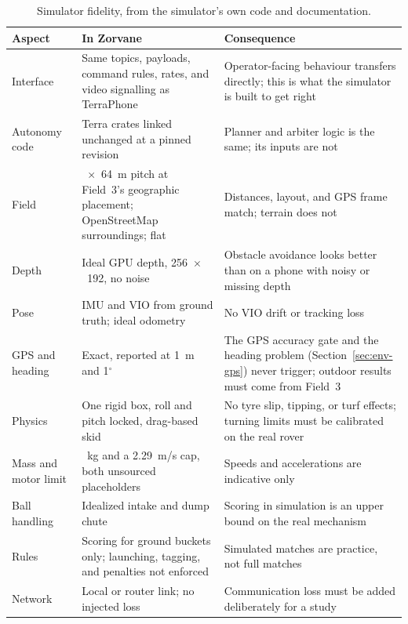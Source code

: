 \begin{table}[ht]
\centering
\small
\caption{Simulator fidelity, from the simulator's own code and documentation.}
\label{tab:sim-fidelity}
\begin{tabularx}{\textwidth}{@{}>{\raggedright\arraybackslash}p{2.6cm} >{\raggedright\arraybackslash}X >{\raggedright\arraybackslash}X@{}}
\toprule
Aspect & In Zorvane & Consequence \\
\midrule
Interface & Same topics, payloads, command rules, rates, and video signalling as TerraPhone & Operator-facing behaviour transfers directly; this is what the simulator is built to get right \\
Autonomy code & Terra crates linked unchanged at a pinned revision & Planner and arbiter logic is the same; its inputs are not \\
Field & 100~$\times$~64~m pitch at Field~3's geographic placement; OpenStreetMap surroundings; flat & Distances, layout, and GPS frame match; terrain does not \\
Depth & Ideal GPU depth, 256~$\times$~192, no noise & Obstacle avoidance looks better than on a phone with noisy or missing depth \\
Pose & IMU and VIO from ground truth; ideal odometry & No VIO drift or tracking loss \\
GPS and heading & Exact, reported at 1~m and 1$^\circ$ & The GPS accuracy gate and the heading problem (Section~\ref{sec:env-gps}) never trigger; outdoor results must come from Field~3 \\
Physics & One rigid box, roll and pitch locked, drag-based skid & No tyre slip, tipping, or turf effects; turning limits must be calibrated on the real rover \\
Mass and motor limit & 20~kg and a 2.29~m/s cap, both unsourced placeholders & Speeds and accelerations are indicative only \\
Ball handling & Idealized intake and dump chute & Scoring in simulation is an upper bound on the real mechanism \\
Rules & Scoring for ground buckets only; launching, tagging, and penalties not enforced & Simulated matches are practice, not full matches \\
Network & Local or router link; no injected loss & Communication loss must be added deliberately for a study \\
\bottomrule
\end{tabularx}
\end{table}

